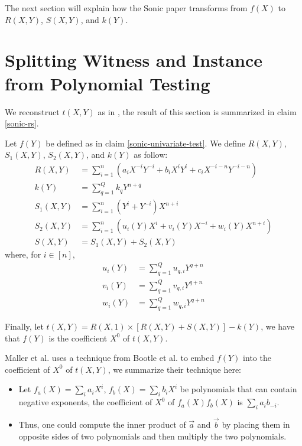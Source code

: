 The next section will explain how the Sonic paper \cite{maller2019sonic} transforms from $f(X)$ to $R(X, Y)$, $S(X, Y)$, and $k(Y)$.

\section{Splitting Witness and Instance from Polynomial Testing}

We reconstruct $t(X, Y)$ as in \cite{maller2019sonic}, the result of this section is summarized in claim \ref{sonic-rs}.

\begin{claim}
\label{sonic-rs}
Let $f(Y)$ be defined as in claim \ref{sonic-univariate-test}.
We define $R(X, Y)$, $S_1(X, Y)$, $S_2(X, Y)$, and $k(Y)$ as follow:
\begin{align*}
R(X, Y) &= \sum_{i=1}^n \left(a_i X^{-i} Y^{-i} + b_i X^{i} Y^{i} + c_i X^{-i-n} Y^{-i-n}\right) \\
k(Y) &= \sum_{q=1}^{Q} k_q Y^{n + q} \\
S_1(X, Y) &= \sum_{i=1}^{n} (Y^{i} + Y^{-i}) X^{n+i} \\
S_2(X, Y) &= \sum_{i=1}^{n} \left( u_i(Y)X^i + v_i(Y)X^{-i} + w_i(Y)X^{n+i}\right) \\
S(X, Y) &= S_1(X, Y) + S_2(X, Y)
\end{align*}
where, for $i \in [n]$,
\begin{align*}
u_i(Y) & = \sum_{q=1}^Q u_{q, i} Y^{q+n} \\
v_i(Y) & = \sum_{q=1}^Q v_{q, i} Y^{q+n} \\
w_i(Y) & = \sum_{q=1}^Q w_{q, i} Y^{q+n}    
\end{align*}

Finally, let $t(X, Y) = R(X, 1) \times \left[ R(X, Y) + S(X, Y) \right] - k(Y)$, we have that $f(Y)$ is the coefficient $X^0$ of $t(X, Y)$.
\end{claim}

Maller et al. \cite{maller2019sonic} uses a technique from Bootle et al. \cite{bootle2016efficient} to embed $f(Y)$ into the coefficient of $X^0$ of $t(X, Y)$, we summarize their technique here:
\begin{itemize}
    \item Let $f_a(X) = \sum_{i} a_i X^{i}$, $f_b(X) = \sum_{i} b_i X^{i}$ be polynomials that can contain negative exponents, the coefficient of $X^0$ of $f_a(X) f_b(X)$ is $\sum_{i} a_i b_{-i}$.
    \item Thus, one could compute the inner product of $\Vec{a}$ and $\Vec{b}$ by placing them in opposite sides of two polynomials and then multiply the two polynomials.
\end{itemize}

